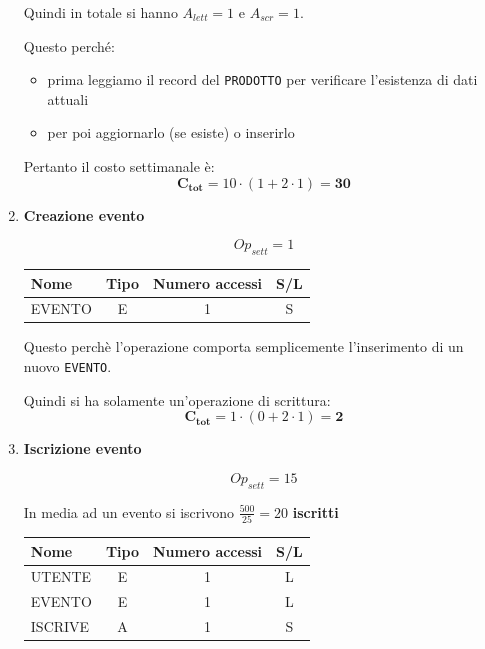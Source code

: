 \documentclass[a4paper,12pt]{report}
\begin{document}
\begin{enumerate}
	      Quindi in totale si hanno $A_{lett}=1$ e $A_{scr}=1$.

	      Questo perché:
	      \begin{itemize}
		      \item prima leggiamo il record del \texttt{PRODOTTO} per verificare l'esistenza di dati attuali
		      \item per poi aggiornarlo (se esiste) o inserirlo
	      \end{itemize}

	      Pertanto il costo settimanale è:
	      $$\mathbf{C_{tot}} = 10 \cdot (1 + 2 \cdot 1) = \mathbf{30}$$

	\item {\large \textbf{Creazione evento}} \label{op9}

	      $$
		      {Op}_{sett} = 1
	      $$

	      \begin{table}[H]
		      \centering
		      \small
		      \renewcommand{\arraystretch}{1.15}
		      \begin{tabularx}{0.8\textwidth}{|X|c|c|c|}
			      \hline
			      \rowcolor{gray!20}
			      \textbf{Nome} & \textbf{Tipo} & \textbf{Numero accessi} & \textbf{S/L} \\
			      \hline
			      EVENTO        & E             & 1                       & S            \\
			      \hline
		      \end{tabularx}
	      \end{table}

	      Questo perchè l'operazione comporta semplicemente l'inserimento di un \newline nuovo \texttt{EVENTO}.

	      Quindi si ha solamente un'operazione di scrittura:
	      $$
		      \mathbf{C_{tot}} = 1 \cdot (0 + 2 \cdot 1) = \mathbf{2}
	      $$

	\item {\large \textbf{Iscrizione evento}} \label{op10}

	      $$
		      {Op}_{sett} = 15
	      $$

	      In media ad un evento si iscrivono $\frac{500}{25}=20$ \textbf{iscritti}

	      \begin{table}[H]
		      \centering
		      \small
		      \renewcommand{\arraystretch}{1.15}
		      \begin{tabularx}{0.9\textwidth}{|X|c|c|c|}
			      \hline
			      \rowcolor{gray!20}
			      \textbf{Nome} & \textbf{Tipo} & \textbf{Numero accessi} & \textbf{S/L} \\
			      \hline
			      UTENTE        & E             & 1                       & L            \\
			      EVENTO        & E             & 1                       & L            \\
			      ISCRIVE       & A             & 1                       & S            \\
			      \hline
		      \end{tabularx}
	      \end{table}


\end{enumerate}
\end{document}
